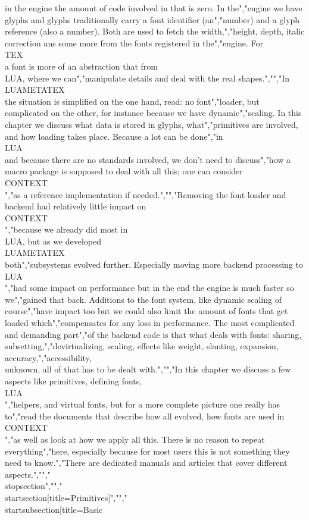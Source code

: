 in the engine the amount of code involved in that is zero. In the","engine we have glyphs and glyphs traditionally carry a font identifier (an","number) and a glyph reference (also a number). Both are used to fetch the width,","height, depth, italic correction ans some more from the fonts registered in the","engine. For \\TEX\\ a font is more of an abstraction that from \\LUA, where we can","manipulate details and deal with the real shapes.","","In \\LUAMETATEX\\ the situation is simplified on the one hand, read: no font","loader, but complicated on the other, for instance because we have dynamic","scaling. In this chapter we discuss what data is stored in glyphs, what","primitives are involved, and how loading takes place. Because a lot can be done","in \\LUA\\ and because there are no standards involved, we don't need to discuss","how a macro package is supposed to deal with all this; one can consider \\CONTEXT\\","as a reference implementation if needed.","","Removing the font loader and backend had relatively little impact on \\CONTEXT\\","because we already did most in \\LUA, but as we developed \\LUAMETATEX\\ both","subsystems evolved further. Especially moving more backend processing to \\LUA\\","had some impact on performance but in the end the engine is much faster so we","gained that back. Additions to the font system, like dynamic scaling of course","have impact too but we could also limit the amount of fonts that get loaded which","compensates for any loss in performance. The most complicated and demanding part","of the backend code is that what deals with fonts: sharing, subsetting,","devirtualizing, scaling, effects like weight, slanting, expansion, accuracy,","accessibility, \\unknown, all of that has to be dealt with.","","In this chapter we discuss a few aspects like primitives, defining fonts, \\LUA\\","helpers, and virtual fonts, but for a more complete picture one really has to","read the documents that describe how all evolved, how fonts are used in \\CONTEXT\\","as well as look at how we apply all this. There is no reason to repeat everything","here, especially because for most users this is not something they need to know.","There are dedicated manuals and articles that cover different aspects.","","\\stopsection","","\\startsection[title={Primitives}]","","\\startsubsection[title=Basic 